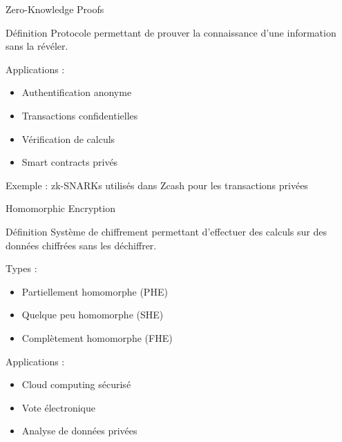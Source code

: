 \begin{frame}{Zero-Knowledge Proofs}
  \begin{block}{Définition}
    Protocole permettant de prouver la connaissance d'une information sans la révéler.
  \end{block}

  Applications :
  \begin{itemize}
    \item Authentification anonyme
    \item Transactions confidentielles
    \item Vérification de calculs
    \item Smart contracts privés
  \end{itemize}

  Exemple : zk-SNARKs utilisés dans Zcash pour les transactions privées
\end{frame}

\begin{frame}{Homomorphic Encryption}
  \begin{block}{Définition}
    Système de chiffrement permettant d'effectuer des calculs sur des données chiffrées sans les déchiffrer.
  \end{block}

  Types :
  \begin{itemize}
    \item Partiellement homomorphe (PHE)
    \item Quelque peu homomorphe (SHE)
    \item Complètement homomorphe (FHE)
  \end{itemize}

  Applications :
  \begin{itemize}
    \item Cloud computing sécurisé
    \item Vote électronique
    \item Analyse de données privées
  \end{itemize}
\end{frame} 